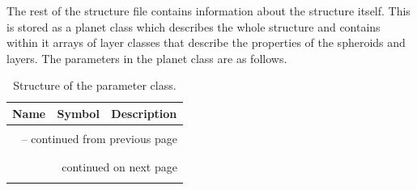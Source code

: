 \documentclass[11pt, oneside]{article}   	%
\begin{document}
The rest of the structure file contains information about the structure itself. This is stored as a planet class which describes the whole structure and contains within it arrays of layer classes that describe the properties of the spheroids and layers. The parameters in the planet class are as follows.


\clearpage
\begin{longtable}{l l p{10cm}}
\caption{Structure of the parameter class.}
\label{tab:parameters_class} \\

Name & Symbol & Description \\ \hline \hline
\multicolumn{3}{l}{} \\
\endfirsthead

\multicolumn{3}{c}{{\tablename\ \thetable{} -- continued from previous page}} \\
\multicolumn{3}{l}{} \\
\endhead

\multicolumn{3}{l}{} \\
\multicolumn{3}{r}{{continued on next page}} \\
\endfoot

\endlastfoot


\end{longtable}
\end{document}
